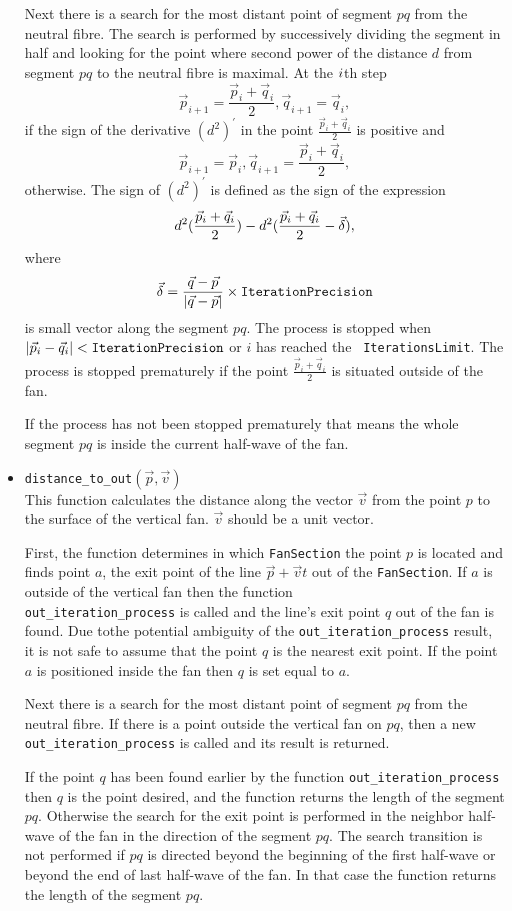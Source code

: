 \documentclass{article}
\begin{document}
\begin{itemize}
Next there is a search for the most distant point of segment
$pq$ from the neutral fibre. The search is performed by successively 
dividing the segment in half and looking for the point
where second power of the distance $d$
from segment $pq$ to the neutral fibre is maximal.
At the $i\/$th step 
\[ \vec{p}_{i+1} = \frac{\vec{p}_i+\vec{q}_i}{2}, \vec{q}_{i+1} = \vec{q}_i,\]
if the sign of the derivative $(d^2)^{\prime}$ in the point
$\frac{\vec{p}_i+\vec{q}_i}{2}$ is positive and 
\[\vec{p}_{i+1} = \vec{p}_i, \vec{q}_{i+1} = \frac{\vec{p}_i+\vec{q}_i}{2},\]
otherwise. 
The sign of $(d^2)^{\prime}$ is defined as the sign of the expression
\[d^2(\frac{\vec{p}_i+\vec{q}_i}{2}) -
d^2(\frac{\vec{p}_i+\vec{q}_i}{2}-\vec{\delta})\/,\] where \[\vec{\delta} =
\frac{\vec{q}-\vec{p}}{|\vec{q}-\vec{p}|}\times{\tt IterationPrecision}\] is
small vector along the segment $pq$.
The process is stopped when 
$|\vec{p}_i-\vec{q}_i|<{\tt IterationPrecision}$ or $i$ has reached the {\tt
IterationsLimit\/}. The process is stopped prematurely if the point
$\frac{\vec{p}_i+\vec{q}_i}{2}$ is situated outside of the fan.

If the process has not been stopped prematurely that means the whole segment
$pq$ is inside the current half-wave of the fan.

\item {\tt distance\_to\_out$(\vec{p}, \vec{v})$}\\
This function calculates the distance along the vector
$\vec{v}$ from the point $p$ to the surface of the vertical fan. $\vec{v}$
should be a unit vector. 

First, the function determines in which {\tt FanSection} the point $p$
is located and finds point $a$, the exit point of the line
$\vec{p}+\vec{v}t$ out of the {\tt FanSection}. 
If $a$ is outside of the vertical fan then the function\\ 
{\tt out\_iteration\_process} is called and the line's exit point $q$ out of
the fan is found. Due tothe  potential ambiguity 
of the {\tt out\_iteration\_process} result, it is
not safe to assume that the point $q$ is the nearest exit point.
If the point $a$
is positioned inside the fan then $q$ is set equal to $a$.

Next there is a search for the most distant point of segment
$pq$ from the neutral fibre.
If there is a point outside the vertical fan on $pq$, then a
new {\tt out\_iteration\_process} is called and its result is returned.

If the point $q$ has been found
earlier by the function {\tt out\_iteration\_process} then $q$ is the point
desired, and the function returns the length of the segment $pq$. Otherwise the
search for the exit point is performed in the neighbor half-wave of the fan
in the direction of the segment $pq$.
The search transition is not performed if $pq$ is directed beyond the beginning of the
first half-wave or beyond the end of last half-wave of the fan. In that case the
function returns the length of the segment $pq$.


\end{itemize}
\end{document}

